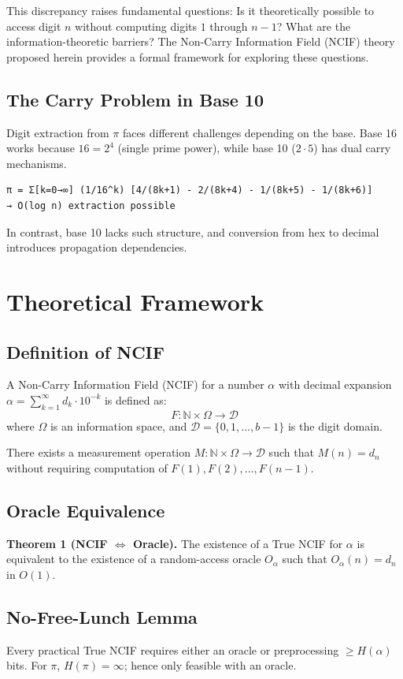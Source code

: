 \documentclass[12pt]{article}
\begin{document}
This discrepancy raises fundamental questions: Is it theoretically possible to access digit $n$ without computing digits $1$ through $n-1$? What are the information-theoretic barriers? The Non-Carry Information Field (NCIF) theory proposed herein provides a formal framework for exploring these questions.

\subsection{The Carry Problem in Base 10}
Digit extraction from $\pi$ faces different challenges depending on the base.  
Base 16 works because $16 = 2^4$ (single prime power), while base 10 ($2 \cdot 5$) has dual carry mechanisms.

\begin{verbatim}
π = Σ[k=0→∞] (1/16^k) [4/(8k+1) - 2/(8k+4) - 1/(8k+5) - 1/(8k+6)]
→ O(log n) extraction possible
\end{verbatim}

In contrast, base 10 lacks such structure, and conversion from hex to decimal introduces propagation dependencies.

\section{Theoretical Framework}
\subsection{Definition of NCIF}
A Non-Carry Information Field (NCIF) for a number $\alpha$ with decimal expansion 
$\alpha = \sum_{k=1}^\infty d_k \cdot 10^{-k}$ is defined as:
\[
F: \mathbb{N} \times \Omega \rightarrow \mathcal{D}
\]
where $\Omega$ is an information space, and $\mathcal{D} = \{0,1,...,b-1\}$ is the digit domain.

There exists a measurement operation $M: \mathbb{N} \times \Omega \rightarrow \mathcal{D}$ such that 
$M(n) = d_n$ without requiring computation of $F(1), F(2), ..., F(n-1)$.

\subsection{Oracle Equivalence}
\textbf{Theorem 1 (NCIF $\Leftrightarrow$ Oracle).}  
The existence of a True NCIF for $\alpha$ is equivalent to the existence of a random-access oracle $O_\alpha$ such that $O_\alpha(n) = d_n$ in $O(1)$.

\subsection{No-Free-Lunch Lemma}
Every practical True NCIF requires either an oracle or preprocessing $\geq H(\alpha)$ bits.  
For $\pi$, $H(\pi) = \infty$; hence only feasible with an oracle.
\end{document}
